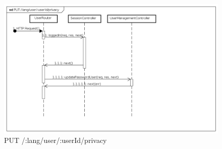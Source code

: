 \begin{itemize}
\label{Fallimento della procedura di modifica password}
\begin{figure}[ht]
	\centering
	\includegraphics[scale=0.40]{UML/DiagrammiDiSequenza/Back-end/PUT_LangUserUserIdPrivacyFailure.png}	
	\caption{PUT /:lang/user/:userId/privacy}
\end{figure}
\FloatBarrier
\end{itemize}


